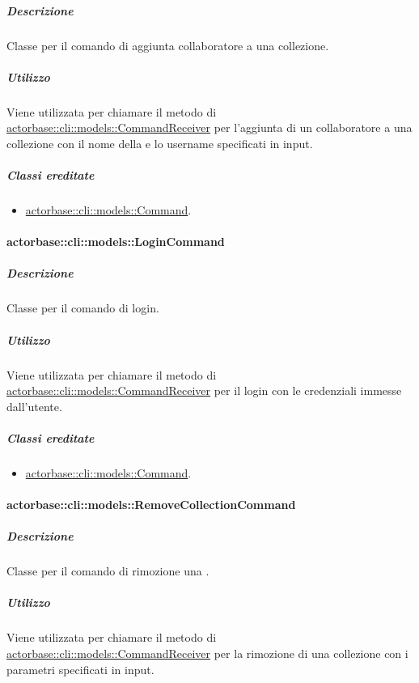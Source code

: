 \documentclass{scalatekids-article}
\begin{document}
\subparagraph{Descrizione}

Classe per il comando di aggiunta collaboratore a una collezione.

\subparagraph{Utilizzo}

Viene utilizzata per chiamare il metodo di
\hyperref[sec:actorbase::cli::models::CommandReceiver]{actorbase::cli::models::CommandReceiver} per l'aggiunta di un collaboratore a
una collezione con il nome della  e lo username specificati
in input.

\subparagraph{Classi ereditate}

\begin{itemize}
\item \hyperref[sec:actorbase::cli::models::Command]{actorbase::cli::models::Command}.
\end{itemize}

\paragraph{actorbase::cli::models::LoginCommand}
\label{sec:actorbase::cli::models::LoginCommand}

\subparagraph{Descrizione}

Classe per il comando di login.

\subparagraph{Utilizzo}

Viene utilizzata per chiamare il metodo di
\hyperref[sec:actorbase::cli::models::CommandReceiver]{actorbase::cli::models::CommandReceiver} per il login con le credenziali
immesse dall'utente.

\subparagraph{Classi ereditate}

\begin{itemize}
\item \hyperref[sec:actorbase::cli::models::Command]{actorbase::cli::models::Command}.
\end{itemize}

\paragraph{actorbase::cli::models::RemoveCollectionCommand}
\label{sec:actorbase::cli::models::RemoveCollectionCommand}

\subparagraph{Descrizione}

Classe per il comando di rimozione una .

\subparagraph{Utilizzo}

Viene utilizzata per chiamare il metodo di
\hyperref[sec:actorbase::cli::models::CommandReceiver]{actorbase::cli::models::CommandReceiver} per la rimozione di una collezione con
i parametri specificati in input.
\end{document}
